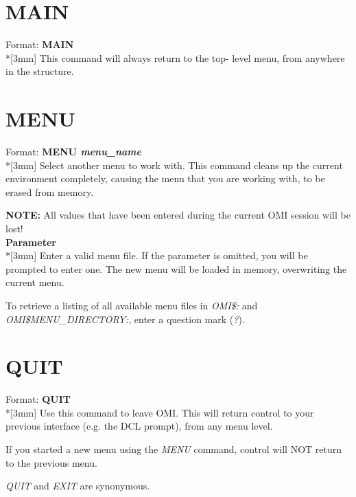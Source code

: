 \documentclass[a4paper]{book}
\newcommand{\vs}{\vspace{3mm}}
\renewcommand{\indent}{\hspace*{5mm}}
\begin{document}
\section{MAIN}
\label{subsec:mylabel17}

\indent Format: \textbf{MAIN}\dag\\*[3mm]
This command will always return to the top- level menu, from anywhere in the 
structure.

\section{MENU}
\label{subsec:mylabel18}

\indent Format: \textbf{MENU \textit{menu{\_}name}}\dag\\*[3mm]
Select another menu to work with. This command cleans up the current 
environment completely, causing the menu that you are working with, to be 
erased from memory.

\vs

\hspace{-8mm}\textbf{NOTE:} All values that have been entered during the current OMI 
session will be lost!\\[3mm]
\textbf{Parameter}\\*[3mm]
Enter a valid menu file. If the parameter is omitted, you will be prompted 
to enter one. The new menu will be loaded in memory, overwriting the current 
menu.

To retrieve a listing of all available menu files in \textsl{OMI{\$}:} and 
\linebreak\textsl{OMI{\$}MENU{\_}DIRECTORY:}, enter a 
question mark (\textsl{?}).

\section{QUIT}
\label{subsec:mylabel19}

\indent Format: \textbf{QUIT}\dag\\*[3mm]
Use this command to leave OMI. This will return control to your previous 
interface (e.g. the DCL prompt), from any menu level.

If you started a new menu using the \textsl{MENU} command, control will NOT return to 
the previous menu.

\vs

\textsl{QUIT} and \textsl{EXIT} are 
synonymous.
\end{document}
